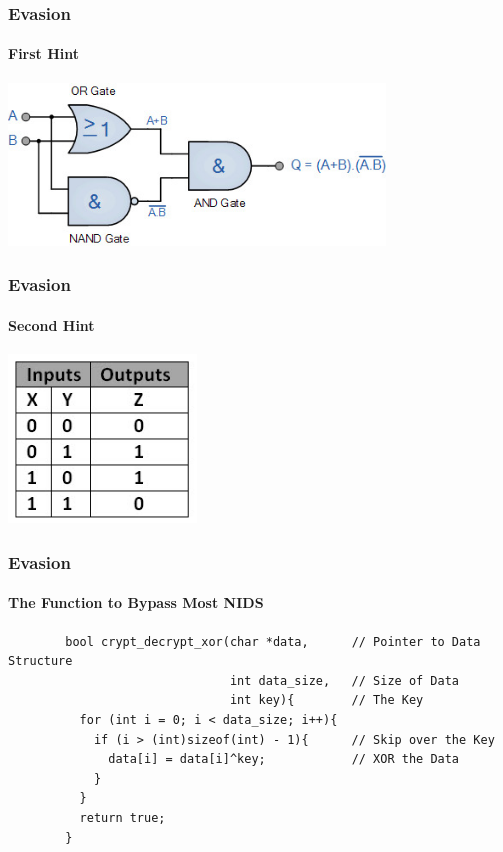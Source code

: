 \documentclass[aspectratio=169]{beamer}
\begin{document}
\begin{frame}
  \frametitle{Evasion}
  \framesubtitle{First Hint}
  \begin{center}
    \includegraphics[width=10cm,keepaspectratio]{xor_gate}
  \end{center}
\end{frame}

\begin{frame}
  \frametitle{Evasion}
  \framesubtitle{Second Hint}
  \begin{center}
    \includegraphics[width=5cm,keepaspectratio]{xor_truth_table}
  \end{center}
\end{frame}

\begin{frame}[fragile]{}
  \frametitle{Evasion}
  \framesubtitle{The Function to Bypass Most NIDS}
  \begin{center}
    \begin{tcolorbox}[title=net.c,colback=black]
    \begin{minipage}{0.5\textwidth}
      \begin{verbatim}
        bool crypt_decrypt_xor(char *data,      // Pointer to Data Structure
                               int data_size,   // Size of Data
                               int key){        // The Key
          for (int i = 0; i < data_size; i++){ 
            if (i > (int)sizeof(int) - 1){      // Skip over the Key
              data[i] = data[i]^key;            // XOR the Data
            }
          }
          return true;
        }
      \end{verbatim}
    \end{minipage}
    \end{tcolorbox}
  \end{center}
\end{frame}
\end{document}
